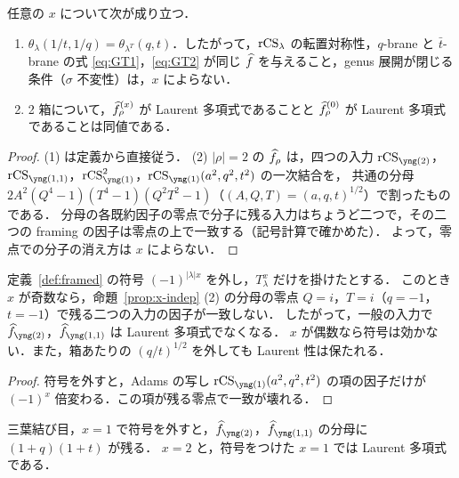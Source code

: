 \begin{proposition}\label{prop:x-indep}
任意の $x$ について次が成り立つ．
\begin{enumerate}
\item $\theta_\lambda(1/t,1/q)=\theta_{\lambda^T}(q,t)$．したがって，$\textrm{rCS}_\lambda$ の転置対称性，$q$-brane と $\bar t$-brane の式 \eqref{eq:GT1}，\eqref{eq:GT2} が同じ $\widehat{f}$ を与えること，genus 展開が閉じる条件（$\sigma$ 不変性）は，$x$ によらない．
\item 2 箱について，$\widehat{f}^{(x)}_\rho$ が Laurent 多項式であることと $\widehat{f}^{(0)}_\rho$ が Laurent 多項式であることは同値である．
\end{enumerate}
\end{proposition}
\begin{proof}
(1) は定義から直接従う．
(2) $|\rho|=2$ の $\widehat{f}_\rho$ は，四つの入力 $\rCS_{\yng(2)}$，$\rCS_{\yng(1,1)}$，$\rCS_{\yng(1)}^2$，$\rCS_{\yng(1)}(a^2,q^2,t^2)$ の一次結合を，
共通の分母 $2A^2(Q^4-1)(T^4-1)(Q^2T^2-1)$（$(A,Q,T)=(a,q,t)^{1/2}$）で割ったものである．
分母の各既約因子の零点で分子に残る入力はちょうど二つで，その二つの framing の因子は零点の上で一致する（記号計算で確かめた）．
よって，零点での分子の消え方は $x$ によらない．
\end{proof}

\begin{proposition}\label{prop:sign}
定義~\ref{def:framed} の符号 $(-1)^{|\lambda|x}$ を外し，$T_\lambda^x$ だけを掛けたとする．
このとき $x$ が奇数なら，命題~\ref{prop:x-indep} (2) の分母の零点 $Q=i$，$T=i$（$q=-1$，$t=-1$）で残る二つの入力の因子が一致しない．
したがって，一般の入力で $\hf_{\yng(2)}$，$\hf_{\yng(1,1)}$ は Laurent 多項式でなくなる．
$x$ が偶数なら符号は効かない．また，箱あたりの $(q/t)^{1/2}$ を外しても Laurent 性は保たれる．
\end{proposition}
\begin{proof}
符号を外すと，Adams の写し $\rCS_{\yng(1)}(a^2,q^2,t^2)$ の項の因子だけが $(-1)^x$ 倍変わる．この項が残る零点で一致が壊れる．
\end{proof}

\begin{compresult}
三葉結び目，$x=1$ で符号を外すと，$\hf_{\yng(2)}$，$\hf_{\yng(1,1)}$ の分母に $(1+q)(1+t)$ が残る．
$x=2$ と，符号をつけた $x=1$ では Laurent 多項式である．
\end{compresult}

